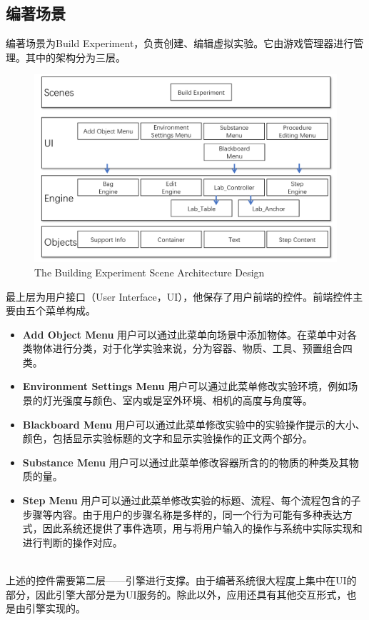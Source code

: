 \subsection{编著场景}
编著场景为Build Experiment，负责创建、编辑虚拟实验。它由游戏管理器进行管理。其中的架构分为三层。

\begin{figure}[!htp]
  \centering
  \includegraphics[width=12cm]{figure/buildearc.png}
    {The Building Experiment Scene Architecture Design}
 \label{fig:gm}
\end{figure}

最上层为用户接口（User Interface，UI），他保存了用户前端的控件。前端控件主要由五个菜单构成。

\begin{itemize}
    \item \textbf{Add Object Menu}
用户可以通过此菜单向场景中添加物体。在菜单中对各类物体进行分类，对于化学实验来说，分为容器、物质、工具、预置组合四类。
    
    \item \textbf{Environment Settings Menu}
用户可以通过此菜单修改实验环境，例如场景的灯光强度与颜色、室内或是室外环境、相机的高度与角度等。
    
    \item \textbf{Blackboard Menu}
用户可以通过此菜单修改实验中的实验操作提示的大小、颜色，包括显示实验标题的文字和显示实验操作的正文两个部分。

    \item \textbf{Substance Menu}
用户可以通过此菜单修改容器所含的的物质的种类及其物质的量。

    \item \textbf{Step Menu}
用户可以通过此菜单修改实验的标题、流程、每个流程包含的子步骤等内容。由于用户的步骤名称是多样的，同一个行为可能有多种表达方式，因此系统还提供了事件选项，用与将用户输入的操作与系统中实际实现和进行判断的操作对应。

\end{itemize}
~\\
\indent    	上述的控件需要第二层——引擎进行支撑。由于编著系统很大程度上集中在UI的部分，因此引擎大部分是为UI服务的。除此以外，应用还具有其他交互形式，也是由引擎实现的。

